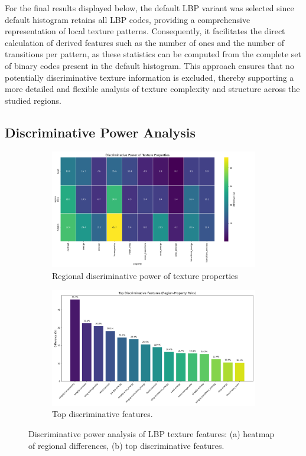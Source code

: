 \documentclass[a4paper,12pt]{report}
\begin{document}
For the final results displayed below, the default LBP variant was selected since default histogram retains all LBP codes, providing a comprehensive representation of local texture patterns. Consequently, it facilitates the direct calculation of derived features such as the number of ones and the number of transitions per pattern, as these statistics can be computed from the complete set of binary codes present in the default histogram. This approach ensures that no potentially discriminative texture information is excluded, thereby supporting a more detailed and flexible analysis of texture complexity and structure across the studied regions.

\subsection{Discriminative Power Analysis}
\begin{figure}[H]
    \centering
    \begin{subfigure}[b]{0.48\textwidth}
        \centering
        \includegraphics[width=\textwidth]{images/LBP/discriminative_power_heatmap.png}
        \caption{Regional discriminative power of texture properties}
        \label{fig:heatmap}
    \end{subfigure}
    \hfill
    \begin{subfigure}[b]{0.48\textwidth}
        \centering
        \includegraphics[width=\textwidth]{images/LBP/top_discriminative_features.png}
        \caption{Top discriminative features.}
        \label{fig:top_features}
    \end{subfigure}
    \caption{Discriminative power analysis of LBP texture features: (a) heatmap of regional differences, (b) top discriminative features.}
    \label{fig:lbp_discriminative_power}
\end{figure}
\end{document}
